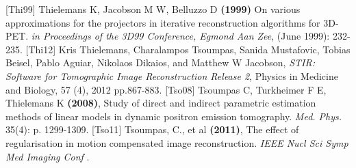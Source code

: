 \documentclass{article}
\begin{document}
{[}Thi99{]} Thielemans K, Jacobson M W, Belluzzo D \textbf{(1999)} On 
various approximations for the projectors in iterative reconstruction 
algorithms for 3D-PET. \textit{in Proceedings of the 3D99 Conference, 
Egmond Aan Zee}, (June 1999): 232-235.
[Thi12] Kris Thielemans, Charalampos Tsoumpas, Sanida Mustafovic, Tobias Beisel, Pablo Aguiar, Nikolaos Dikaios, and Matthew W Jacobson,
\textit{STIR: Software for Tomographic Image Reconstruction Release 2},
Physics in Medicine and Biology, 57 (4), 2012 pp.867-883.
{[}Tso08{]} Tsoumpas C, Turkheimer F E, Thielemans K \textbf{(2008)},
Study of direct and indirect parametric estimation methods of linear
models in dynamic positron emission tomography. \textit{Med. Phys.} 35(4):
p. 1299-1309.
{[}Tso11{]} Tsoumpas, C., et al \textbf{(2011)}, The effect of
regularisation in motion compensated image reconstruction. \textit { IEEE
Nucl Sci Symp Med Imaging Conf }.
\end{document}
